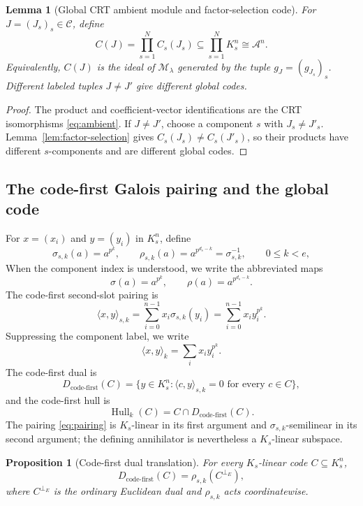 \documentclass[11pt]{article}
\newcommand{\A}{\mathcal A}
\newcommand{\Hull}{\operatorname{Hull}}
\newcommand{\perpE}{\perp_E}
\newcommand{\CF}{\mathrm{code\text{-}first}}
\theoremstyle{plain}
\newtheorem{lemma}{Lemma}
\newtheorem{proposition}{Proposition}
\theoremstyle{definition}
\theoremstyle{remark}
\begin{document}
\begin{lemma}[Global CRT ambient module and factor-selection code]\label{lem:global-code}
For $J=(J_s)_s\in\mathscr C$, define
\[
C(J)=\prod_{s=1}^{N}C_s(J_s)\subseteq\prod_{s=1}^{N}K_s^n\cong\A^n.
\]
Equivalently, $C(J)$ is the ideal of $\mathcal M_\lambda$ generated by the tuple $g_J=(g_{J_s})_s$. Different labeled tuples $J\ne J'$ give different global codes.
\end{lemma}

\begin{proof}
The product and coefficient-vector identifications are the CRT isomorphisms \eqref{eq:ambient}. If $J\ne J'$, choose a component $s$ with $J_s\ne J'_s$. Lemma~\ref{lem:factor-selection} gives $C_s(J_s)\ne C_s(J'_s)$, so their products have different $s$-components and are different global codes.
\end{proof}

\subsection{The code-first Galois pairing and the global code}

For $x=(x_i)$ and $y=(y_i)$ in $K_s^n$, define
\[
\sigma_{s,k}(a)=a^{p^k},
\qquad
\rho_{s,k}(a)=a^{p^{d_s-k}}=\sigma_{s,k}^{-1},
\qquad 0\leq k<e,
\]
When the component index is understood, we write the abbreviated maps
\[
\sigma(a)=a^{p^k},
\qquad
\rho(a)=a^{p^{d_s-k}}.
\]
The code-first second-slot pairing is
\begin{equation}\label{eq:pairing}
\langle x,y\rangle_{s,k}
 =\sum_{i=0}^{n-1}x_i\sigma_{s,k}(y_i)
 =\sum_{i=0}^{n-1}x_i y_i^{p^k}.
\end{equation}
Suppressing the component label, we write
\[
\langle x,y\rangle_k=\sum_i x_i y_i^{p^k}.
\]
The code-first dual is
\[
D_{\CF}(C)=\{y\in K_s^n:\langle c,y\rangle_{s,k}=0\text{ for every }c\in C\},
\]
and the code-first hull is
\[
\Hull_k(C)=C\cap D_{\CF}(C).
\]
The pairing \eqref{eq:pairing} is $K_s$-linear in its first argument and $\sigma_{s,k}$-semilinear in its second argument; the defining annihilator is nevertheless a $K_s$-linear subspace.

\begin{proposition}[Code-first dual translation]\label{prop:dual-translation}
For every $K_s$-linear code $C\subseteq K_s^n$,
\[
D_{\CF}(C)=\rho_{s,k}(C^{\perpE}),
\]
where $C^{\perpE}$ is the ordinary Euclidean dual and $\rho_{s,k}$ acts coordinatewise.
\end{proposition}
\end{document}
